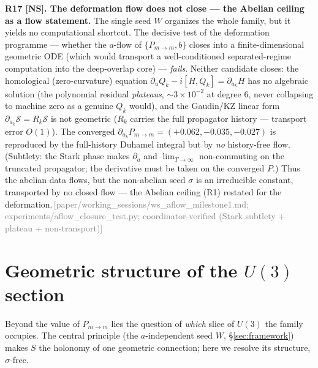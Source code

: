 \documentclass[aps,prd,reprint,nofootinbib]{revtex4-2}
\newcommand{\pnote}[1]{\textcolor{gray}{\footnotesize\,[#1]}}
\newcommand{\Scat}{\mathcal{S}}   %
\newcommand{\Pmid}{P_{m\to m}}   %
\begin{document}
\textbf{R17 [NS]. The deformation flow does not close --- the Abelian ceiling as a flow statement.}
The single seed $W$ organizes the whole family, but it yields no computational shortcut. The decisive
test of the deformation programme --- whether the $a$-flow of $\{\Pmid,b\}$ closes into a
finite-dimensional geometric ODE (which would transport a well-conditioned separated-regime computation
into the deep-overlap core) --- \emph{fails}. Neither candidate closes: the homological (zero-curvature)
equation $\partial_u Q_k-i[H,Q_k]=\partial_{a_k}H$ has no algebraic solution (the polynomial residual
\emph{plateaus}, $\sim3\times10^{-2}$ at degree $6$, never collapsing to machine zero as a genuine
$Q_k$ would), and the Gaudin/KZ linear form $\partial_{a_k}\Scat=R_k\Scat$ is not geometric ($R_k$
carries the full propagator history --- transport error $O(1)$). The converged
$\partial_{a_k}\Pmid=(+0.062,-0.035,-0.027)$ is reproduced by the full-history Duhamel integral but by
\emph{no} history-free flow. (Subtlety: the Stark phase makes $\partial_a$ and $\lim_{T\to\infty}$
non-commuting on the truncated propagator; the derivative must be taken on the converged $P$.) Thus the
abelian data flows, but the non-abelian seed $\sigma$ is an irreducible constant, transported by no
closed flow --- the Abelian ceiling (R1) restated for the deformation.\pnote{paper/working\_sessions/ws\_aflow\_milestone1.md;
experiments/aflow\_closure\_test.py; coordinator-verified (Stark subtlety + plateau + non-transport)}

\section{Geometric structure of the $U(3)$ section}\label{sec:geom}
Beyond the value of $\Pmid$ lies the question of \emph{which} slice of $U(3)$ the family occupies. The
central principle (the $a$-independent seed $W$, \S\ref{sec:framework}) makes $S$ the holonomy of one
geometric connection; here we resolve its structure, $\sigma$-free.
\end{document}
